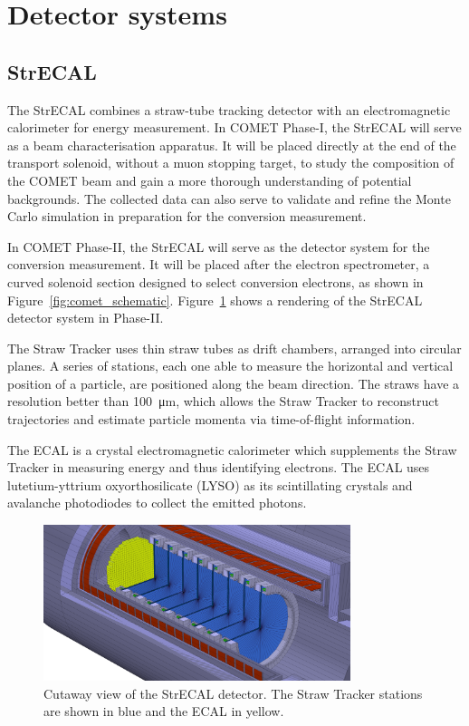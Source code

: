 \section{Detector systems}
\subsection{StrECAL}
The StrECAL combines a straw-tube tracking detector with an electromagnetic
calorimeter for energy measurement. In COMET Phase-I, the StrECAL will serve as
a beam characterisation apparatus. It will be placed directly at the end of the
transport solenoid, without a muon stopping target, to study the composition of
the COMET beam and gain a more thorough understanding of potential backgrounds.
The collected data can also serve to validate and refine the Monte Carlo
simulation in preparation for the conversion measurement.

In COMET Phase-II, the StrECAL will serve as the detector system for the
conversion measurement. It will be placed after the electron spectrometer, a
curved solenoid section designed to select conversion electrons, as shown in
Figure~\ref{fig:comet_schematic}. Figure~\ref{fig:strecal} shows a rendering of
the StrECAL detector system in Phase-II.

The Straw Tracker uses thin straw tubes as drift chambers, arranged into
circular planes. A series of stations, each one able to measure the horizontal
and vertical position of a particle, are positioned along the beam direction.
The straws have a resolution better than \SI{100}{\um}, which allows the Straw
Tracker to reconstruct trajectories and estimate particle momenta via
time-of-flight information.

The ECAL is a crystal electromagnetic calorimeter which supplements the Straw
Tracker in measuring energy and thus identifying electrons. The ECAL uses
lutetium-yttrium oxyorthosilicate (LYSO) as its scintillating crystals and
avalanche photodiodes to collect the emitted photons.


\begin{figure}
    \centering
    \includegraphics[width=0.8\textwidth]{chapter2/strecal_recolor.png}
    \caption{ Cutaway view of the StrECAL detector. The Straw Tracker stations
    are shown in blue and the ECAL in yellow.  }
    \label{fig:strecal}
\end{figure}

